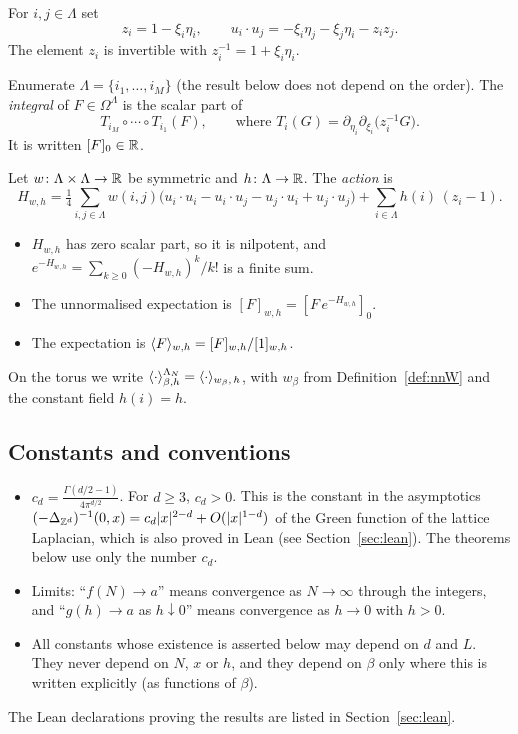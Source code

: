 \documentclass[11pt]{amsart}
\numberwithin{equation}{section}
\numberwithin{theorem}{section}
\begin{document}
\begin{definition}\label{def:spins}
For $i,j\in\Lambda$ set
\begin{equation}\label{e:spins}
  z_i=1-\xi_i\eta_i,\qquad
  u_i\cdot u_j=-\xi_i\eta_j-\xi_j\eta_i-z_iz_j .
\end{equation}
The element $z_i$ is invertible with $z_i^{-1}=1+\xi_i\eta_i$.

Enumerate $\Lambda=\{i_1,\dots,i_M\}$ (the result below does not depend on the order). The
\emph{integral} of $F\in\Omega^\Lambda$ is the scalar part of
\[
  T_{i_M}\circ\cdots\circ T_{i_1}(F),\qquad\text{where } T_i(G)=\partial_{\eta_i}\partial_{\xi_i}\bigl(z_i^{-1}G\bigr).
\]
It is written $[F]_0\in\mathbb{R}$.
\end{definition}

\begin{definition}\label{def:action}
Let $w\colon\Lambda\times\Lambda\to\mathbb{R}$ be symmetric and $h\colon\Lambda\to\mathbb{R}$. The
\emph{action} is
\begin{equation}\label{e:action}
  H_{w,h}=\tfrac14\sum_{i,j\in\Lambda}w(i,j)\bigl(u_i\cdot u_i-u_i\cdot u_j-u_j\cdot u_i+u_j\cdot u_j\bigr)+\sum_{i\in\Lambda}h(i)\,(z_i-1).
\end{equation}
\begin{itemize}
\item $H_{w,h}$ has zero scalar part, so it is nilpotent, and
  $e^{-H_{w,h}}=\sum_{k\ge0}(-H_{w,h})^k/k!$ is a finite sum.
\item The unnormalised expectation is $[F]_{w,h}=[F\,e^{-H_{w,h}}]_0$.
\item The expectation is $\langle F \rangle_{w,h}=[F]_{w,h}/[1]_{w,h}$.
\end{itemize}
On the torus we write
$\langle \cdot \rangle_{\beta,h}^{\Lambda_N}=\langle \cdot \rangle_{w_\beta,\,h}$, with $w_\beta$
from Definition~\ref{def:nnW} and the constant field $h(i)=h$.
\end{definition}

\subsection{Constants and conventions}\label{sec:constants}

\begin{itemize}
\item $\displaystyle c_d=\frac{\Gamma(d/2-1)}{4\pi^{d/2}}$.
  For $d\ge3$, $c_d>0$. This is the constant in the asymptotics
  $(-\Delta_{\mathbb{Z}^d})^{-1}(0,x)=c_d|x|^{2-d}+O(|x|^{1-d})$ of the Green function of the lattice
  Laplacian, which is also proved in Lean (see Section~\ref{sec:lean}). The
  theorems below use only the number $c_d$.
\item Limits: ``$f(N)\to a$'' means convergence as $N\to\infty$ through the integers, and
  ``$g(h)\to a$ as $h\downarrow0$'' means convergence as $h\to0$ with $h>0$.
\item All constants whose existence is asserted below may depend on $d$ and $L$. They never
  depend on $N$, $x$ or $h$, and they depend on $\beta$ only where this is written explicitly
  (as functions of $\beta$).
\end{itemize}
The Lean declarations proving the results are listed in Section~\ref{sec:lean}.
\end{document}
